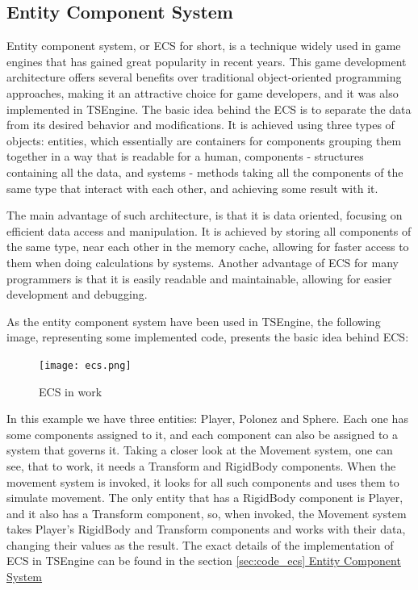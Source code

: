 \subsection{Entity Component System}
\label{sec:theory_ecs}
\hspace{\parindent}
Entity component system, or ECS for short, is a technique widely used in game engines that has gained great popularity in recent years. This game development architecture offers several benefits over traditional object-oriented programming approaches, making it an attractive choice for game developers, and it was also implemented in TSEngine. The basic idea behind the ECS is to separate the data from its desired behavior and modifications. It is achieved using three types of objects: entities, which essentially are containers for components grouping them together in a way that is readable for a human, components - structures containing all the data, and systems - methods taking all the components of the same type that interact with each other, and achieving some result with it. 

The main advantage of such architecture, is that it is data oriented, focusing on efficient data access and manipulation. It is achieved by storing all components of the same type, near each other in the memory cache, allowing for faster access to them when doing calculations by systems. Another advantage of ECS for many programmers is that it is easily readable and maintainable, allowing for easier development and debugging.

As the entity component system have been used in TSEngine, the following image, representing some implemented code, presents the basic idea behind ECS:
\begin{figure}[H]
  \begin{center}
    \texttt{[image: ecs.png]}
  \end{center}
  \caption{ECS in work}
\end{figure}
In this example we have three entities: Player, Polonez and Sphere. Each one has some components assigned to it, and each component can also be assigned to a system that governs it. Taking a closer look at the Movement system, one can see, that to work, it needs a Transform and RigidBody components. When the movement system is invoked, it looks for all such components and uses them to simulate movement. The only entity that has a RigidBody component is Player, and it also has a Transform component, so, when invoked, the Movement system takes Player's RigidBody and Transform components and works with their data, changing their values as the result. The exact details of the implementation of ECS in TSEngine can be found in the section \hyperref[sec:code_ecs]{\ref*{sec:code_ecs} Entity Component System}

